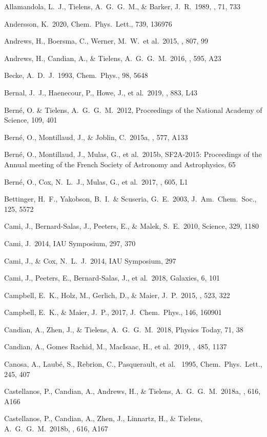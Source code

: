 \documentclass{aa}
\begin{document}
Allamandola, L.~J., Tielens, A.~G.~G.~M., \& Barker, J.~R.\ 1989, \apjs, 71, 733

Andersson, K.\ 2020, Chem.\ Phys.\ Lett., 739, 136976

Andrews, H., Boersma, C., Werner, M.~W.\ et al.\ 2015, \apj, 807, 99

Andrews, H., Candian, A., \& Tielens, A.~G.~G.~M.\ 2016, \aap, 595, A23

Becke, A.~D.~J.\ 1993, Chem.\ Phys., 98, 5648

Bernal, J.~J., Haenecour, P., Howe, J., et al.\ 2019, \apjl, 883, L43

Bern{\'e}, O. \& Tielens, A.~G.~G.~M.\ 2012, Proceedings of the National Academy of Science, 109, 401

Bern{\'e}, O., Montillaud, J., \& Joblin, C.\ 2015a, \aap, 577, A133

Bern{\'e}, O., Montillaud, J., Mulas, G., et al.\ 2015b, SF2A-2015: Proceedings of the Annual meeting of the French Society of Astronomy and Astrophysics, 65

Bern{\'e}, O., Cox, N.~L.~J., Mulas, G., et al.\ 2017, \aap, 605, L1

Bettinger, H.~F., Yakobson, B.~I.\ \& Scuseria, G.~E.\ 2003, J.\ Am.\ Chem.\ Soc., 125, 5572

Cami, J., Bernard-Salas, J., Peeters, E., \& Malek, S.~E.\ 2010, Science, 
329, 1180 

Cami, J.\ 2014, IAU Symposium, 297, 370 

Cami, J., \& Cox, N.~L.~J.\ 2014, IAU Symposium, 297

Cami, J., Peeters, E., Bernard-Salas, J., et al.\ 2018, Galaxies, 6, 101

Campbell, E.~K., Holz, M., Gerlich, D., \& Maier, J.~P.\ 2015, \nat, 523, 
322 

Campbell, E.~K., \& Maier, J.~P., 2017, J.\ Chem.\ Phys., 146, 160901

Candian, A., Zhen, J., \& Tielens, A.~G.~G.~M.\ 2018, Physics Today, 71, 38

Candian, A., Gomes Rachid, M., MacIsaac, H., et al.\ 2019, \mnras, 485, 1137

Canosa, A., Laub\'e, S., Rebrion, C., Pasquerault, et al.\ 
1995, Chem.\ Phys.\ Lett., 245, 407

Castellanos, P., Candian, A., Andrews, H., \& Tielens, A.~G.~G.~M.\ 2018a, \aap, 616, A166 

Castellanos, P., Candian, A., Zhen, J., Linnartz, H., \& Tielens, A.~G.~G.~M.\ 2018b, \aap, 616, A167
\end{document}
